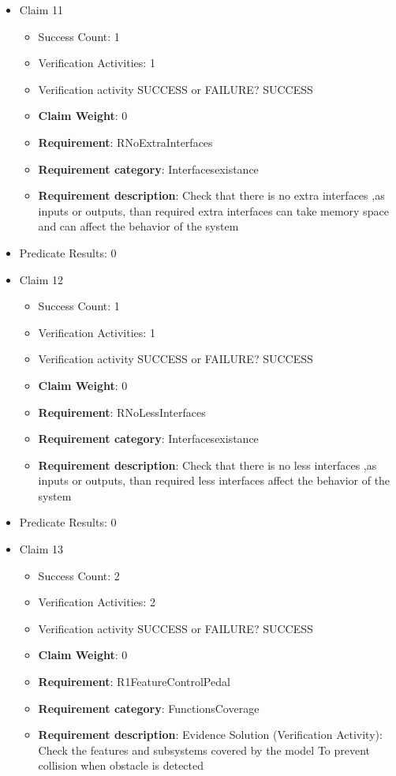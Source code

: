 \documentclass{article}
\begin{document}
\begin{itemize}
  				  \item Claim 11
				\begin{itemize}
			    	\item Success Count: 1 
			    	\item Verification Activities: 1
					\item Verification activity SUCCESS or FAILURE? SUCCESS
					\item \textbf{Claim Weight}: 0
						\item \textbf{Requirement}: RNoExtraInterfaces 
						\item \textbf{Requirement category}: Interfacesexistance 
						\item \textbf{Requirement description}: Check that there is no extra interfaces ,as inputs or outputs, than required  extra interfaces can take memory space and can affect the behavior of the system
					
				\end{itemize}
				
									    
				\item Predicate Results: 0

  				  \item Claim 12
				\begin{itemize}
			    	\item Success Count: 1 
			    	\item Verification Activities: 1
					\item Verification activity SUCCESS or FAILURE? SUCCESS
					\item \textbf{Claim Weight}: 0
						\item \textbf{Requirement}: RNoLessInterfaces 
						\item \textbf{Requirement category}: Interfacesexistance 
						\item \textbf{Requirement description}: Check that there is no less interfaces ,as inputs or outputs, than required  less interfaces affect the behavior of the system
					
				\end{itemize}
				
									    
				\item Predicate Results: 0

  				  \item Claim 13
				\begin{itemize}
			    	\item Success Count: 2 
			    	\item Verification Activities: 2
					\item Verification activity SUCCESS or FAILURE? SUCCESS
					\item \textbf{Claim Weight}: 0
						\item \textbf{Requirement}: R1FeatureControlPedal 
						\item \textbf{Requirement category}: FunctionsCoverage 
						\item \textbf{Requirement description}: Evidence Solution (Verification Activity): Check the features and subsystems covered by the model  To prevent collision when obstacle is detected
					

\end{itemize}
\end{itemize}
\end{document}
